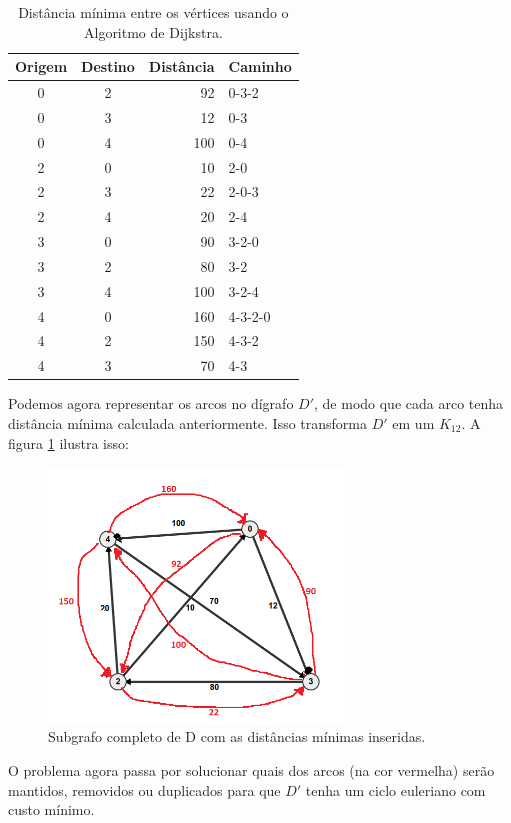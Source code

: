 \documentclass[a4paper, 12pt]{article}
\begin{document}
\begin{table}[H]
	\centering
	\begin{tabular}{c c r l}
		\toprule[1.5pt]
		\textbf{Origem}  & \textbf{Destino} & \textbf{Distância} & \textbf{Caminho}\\
		\midrule
		0 & 2 & 92 & 0-3-2\\
		0 & 3 & 12 & 0-3\\
		0 & 4 & 100& 0-4\\
		2 & 0 & 10 & 2-0\\ 
		2 & 3 & 22 & 2-0-3\\
		2 & 4 & 20 & 2-4\\
		3 & 0 & 90 & 3-2-0\\
		3 & 2 & 80 & 3-2\\
		3 & 4 & 100& 3-2-4\\
		4 & 0 & 160& 4-3-2-0\\
		4 & 2 & 150& 4-3-2\\
		4 & 3 & 70 & 4-3\\
		\bottomrule[1.5pt]
		
	\end{tabular}
	\caption{Distância mínima entre os vértices usando o Algoritmo de Dijkstra.}
	\label{tab:distancia_minima}
\end{table}

Podemos agora representar os arcos no dígrafo $D'$, de modo que cada arco tenha distância mínima calculada anteriormente. Isso transforma $D'$ em um $K_{12}$. A figura \ref{fig:subgrafoG_Km} ilustra isso:

\begin{figure}[H]
	\centering
	\includegraphics[width=8cm]{img/subgrafoG - Km.png}
	\caption{Subgrafo completo de D com as distâncias mínimas inseridas.}
	\label{fig:subgrafoG_Km}
\end{figure}

O problema agora passa por solucionar quais dos arcos (na cor vermelha) serão mantidos, removidos ou duplicados para que $D'$ tenha um ciclo euleriano com custo mínimo.
\end{document}
